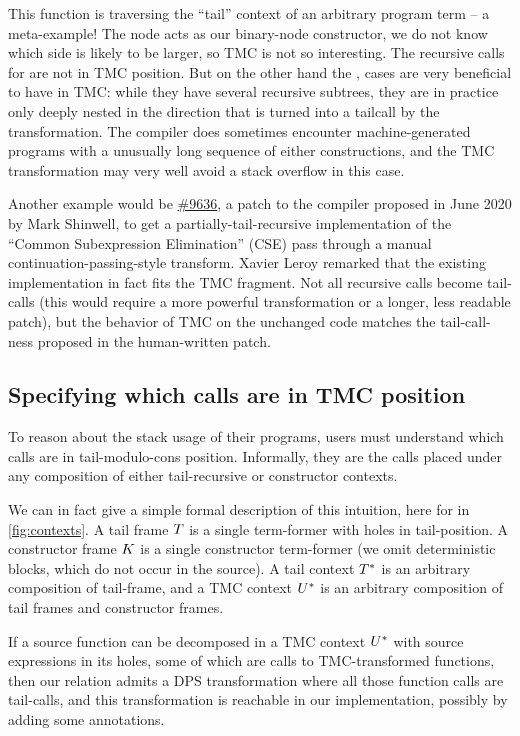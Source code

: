 This function is traversing the ``tail'' context of an arbitrary
program term -- a meta-example! The  node acts as
our binary-node constructor, we do not know which side is likely to be
larger, so TMC is not so interesting. The recursive calls for
 are not in TMC position. But on the other hand the
,  cases are very beneficial to have in
TMC: while they have several recursive subtrees, they are in practice
only deeply nested in the direction that is turned into a tailcall by
the transformation. The \OCaml compiler does sometimes encounter
machine-generated programs with a unusually long sequence of either
constructions, and the TMC transformation may very well avoid a stack
overflow in this case.

Another example would be
\href{https://github.com/ocaml/ocaml/pull/9636}{\#9636}, a patch to
the \OCaml compiler proposed in June 2020 by Mark Shinwell, to get
a partially-tail-recursive implementation of the ``Common
Subexpression Elimination'' (CSE) pass through a manual
continuation-passing-style transform. Xavier Leroy remarked that the
existing implementation in fact fits the TMC fragment. Not all
recursive calls become tail-calls (this would require a more powerful
transformation or a longer, less readable patch), but the behavior of
TMC on the unchanged code matches the tail-call-ness proposed in the
human-written patch.

\subsection{Specifying which calls are in TMC position} \label{subsec:specification}
To reason about the stack usage of their programs, users must understand which calls are in tail-modulo-cons position.
Informally, they are the calls placed under any composition of either tail-recursive or constructor contexts.

We can in fact give a simple formal description of this intuition, here for \DataLang in \cref{fig:contexts}.
A tail frame $\datalangTailFrame$ is a single term-former with holes in tail-position.
A constructor frame $\datalangConsFrame$ is a single constructor term-former (we omit deterministic blocks, which do not occur in the source).
A tail context $\datalangTailCtx$ is an arbitrary composition of tail-frame, and a TMC context $\datalangTMCCtx$ is an arbitrary composition of tail frames and constructor frames.

If a source function can be decomposed in a TMC context $\datalangTMCCtx$ with source expressions in its holes, some of which are calls to TMC-transformed functions, then our relation admits a DPS transformation where all those function calls are tail-calls, and this transformation is reachable in our \OCaml implementation, possibly by adding some annotations.

